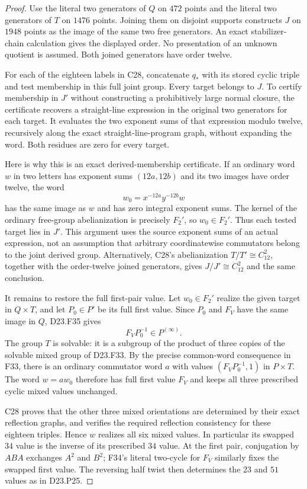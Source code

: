 \begin{proof}
Use the literal two generators of $Q$ on $472$ points and the
literal two generators of $T$ on $1476$ points. Joining them on
disjoint supports constructs $J$ on $1948$ points as the image of
the same two free generators. An exact stabilizer-chain calculation
gives the displayed order. No presentation of an unknown quotient
is assumed. Both joined generators have order twelve.

For each of the eighteen labels in C28, concatenate $q_*$ with
its stored cyclic triple and test membership in this full joint
group. Every target belongs to $J$. To certify membership in $J'$
without constructing a prohibitively large normal closure, the
certificate recovers a straight-line expression in the original
two generators for each target. It evaluates the two exponent sums
of that expression modulo twelve, recursively along the exact
straight-line-program graph, without expanding the word. Both
residues are zero for every target.

Here is why this is an exact derived-membership certificate.
If an ordinary word $w$ in two letters has exponent sums
$(12a,12b)$ and its two images have order twelve, the word
\[
                           w_0=x^{-12a}y^{-12b}w
\]
has the same image as $w$ and has zero integral exponent sums.
The kernel of the ordinary free-group abelianization is precisely
$F_2'$, so $w_0\in F_2'$. Thus each tested target lies in $J'$.
This argument uses the source exponent sums of an actual expression,
not an assumption that arbitrary coordinatewise commutators belong
to the joint derived group. Alternatively, C28's abelianization
$T/T'\cong C_{12}^2$, together with the order-twelve joined generators,
gives $J/J'\cong C_{12}^2$ and the same conclusion.

It remains to restore the full first-pair value. Let $w_0\in F_2'$
realize the given target in $Q\times T$, and let $P_0\in P'$ be its
full first value. Since $P_0$ and $F_V$ have the same image in $Q$,
D23.F35 gives
\[
                          F_VP_0^{-1}\in P^{(\infty)}.
\]
The group $T$ is solvable: it is a subgroup of the product of three
copies of the solvable mixed group of D23.F33. By the precise
common-word consequence in F33, there is an ordinary commutator
word $a$ with values $(F_VP_0^{-1},1)$ in $P\times T$.
The word $w=aw_0$ therefore has full first value $F_V$ and keeps
all three prescribed cyclic mixed values unchanged.

C28 proves that the other three mixed orientations are determined
by their exact reflection graphs, and verifies the required
reflection consistency for these eighteen triples. Hence $w$
realizes all six mixed values. In particular its swapped $34$
value is the inverse of its prescribed $34$ value. At the first
pair, conjugation by $ABA$ exchanges $A^2$ and $B^2$; F34's
literal two-cycle for $F_V$ similarly fixes the swapped first
value. The reversing half twist then determines the $23$ and $51$
values as in D23.P25.


\end{proof}
